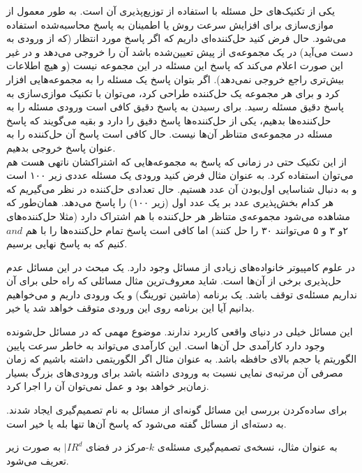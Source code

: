  یکی از تکنیک‌های حل مسئله با استفاده از توزیع‌پذیری آن است. به طور معمول از موازی‌سازی برای افزایش سرعت روش یا اطمینان به پاسخ محاسبه‌شده استفاده می‌شود. حال فرض کنید حل‌کننده‌ای  داریم که اگر پاسخ مورد انتظار (که از ورودی به دست می‌آید) در یک مجموعه‌ی از پیش تعیین‌شده باشد آن را خروجی می‌دهد و در غیر این صورت اعلام می‌کند که پاسخ این مسئله در این مجموعه نیست (و هیچ اطلاعات بیش‌تری راجع خروجی نمی‌دهد). اگر بتوان پاسخ یک مسئله را به مجموعه‌هایی افزار کرد و برای هر مجموعه یک حل‌کننده طراحی کرد، می‌توان با تکنیک موازی‌سازی به پاسخ دقیق مسئله رسید. برای رسیدن به پاسخ دقیق کافی است ورودی مسئله را به حل‌کننده‌ها بدهیم، یکی از حل‌کننده‌ها پاسخ دقیق را دارد و بقیه می‌گویند که پاسخ مسئله در مجموعه‌ی متناظر آن‌ها نیست. حال کافی است پاسخ آن حل‌کننده را به عنوان پاسخ خروجی بدهیم.\\
از این تکنیک حتی در زمانی که پاسخ به مجموعه‌هایی که اشتراکشان ناتهی هست هم می‌توان استفاده کرد. به عنوان مثال فرض کنید ورودی یک مسئله عددی زیر ۱۰۰ است و به دنبال شناسایی اول‌بودن آن عدد هستیم. حال تعدادی حل‌کننده در نظر می‌گیریم که هر کدام بخش‌پذیری عدد بر یک عدد اول (زیر ۱۰۰) را پاسخ می‌دهد. همان‌طور که مشاهده می‌شود مجموعه‌ی متناظر هر حل‌کننده با هم اشتراک دارد (مثلا حل‌کننده‌های ۲و ۳ و ۵ می‌توانند ۳۰ را حل کنند) اما کافی است پاسخ تمام حل‌کننده‌ها را با هم $and$ کنیم که به پاسخ نهایی برسیم.



در علوم کامپیوتر خانواده‌های زیادی از مسائل وجود دارد. یک مبحث در این مسائل عدم حل‌پذیری برخی از آن‌ها است. شاید معروف‌ترین مثال مسائلی که راه حلی برای آن نداریم مسئله‌ی توقف باشد. یک برنامه (ماشین تورینگ) و یک ورودی داریم و می‌خواهیم بدانیم آیا این برنامه روی این ورودی متوقف خواهد شد یا خیر. 

این مسائل خیلی در دنیای واقعی کاربرد ندارند. موضوع مهمی که در مسائل حل‌شونده وجود دارد کارآمدی حل آن‌ها است. این کارآمدی می‌تواند به خاطر سرعت پایین الگوریتم یا حجم بالای حافظه باشد. به عنوان مثال اگر الگوریتمی داشته باشیم که زمان مصرفی آن مرتبه‌ی نمایی نسبت به ورودی داشته باشد برای ورودی‌های بزرگ بسیار زمان‌بر خواهد بود و عمل نمی‌توان آن را اجرا کرد.

برای ساده‌کردن بررسی این مسائل گونه‌ای از مسائل به نام تصمیم‌گیری ایجاد شدند.
 به دسته‌ای از مسائل گفته می‌شود که پاسخ آن‌ها تنها بله یا خیر است.

به عنوان مثال، نسخه‌ی تصمیم‌گیری مسئله‌ی $k$-مرکز در فضای $|IR^d$ به صورت زیر تعریف می‌شود.

